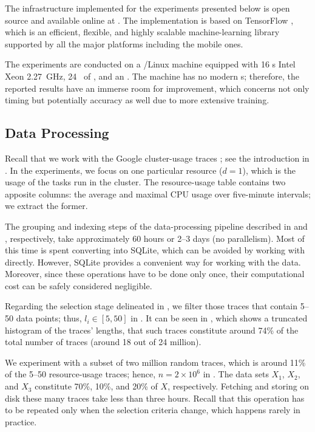 The infrastructure implemented for the experiments presented below is open
source and available online at \cite{sources}. The implementation is based on
TensorFlow \cite{abadi2015}, which is an efficient, flexible, and highly
scalable machine-learning library supported by all the major platforms including
the mobile ones.

The experiments are conducted on a /Linux machine equipped with 16
s Intel Xeon  2.27~GHz, 24~ of , and an
. The machine has no modern s; therefore, the reported results
have an immerse room for improvement, which concerns not only timing but
potentially accuracy as well due to more extensive training.

\subsection{Data Processing}
Recall that we work with the Google cluster-usage traces \cite{reiss2011}; see
the introduction in . In the experiments, we focus on one particular
resource ($d = 1$), which is the  usage of the tasks run in the cluster.
The resource-usage table contains two apposite columns: the average and maximal
CPU usage over five-minute intervals; we extract the former.

The grouping and indexing steps of the data-processing pipeline described in
 and , respectively, take approximately 60 hours
or 2--3 days (no parallelism). Most of this time is spent converting 
into SQLite, which can be avoided by working with  directly. However,
SQLite provides a convenient way for working with the data. Moreover, since
these operations have to be done only once, their computational cost can be
safely considered negligible.


Regarding the selection stage delineated in , we filter those
traces that contain 5--50 data points; thus, $l_i \in [5, 50]$ in .
It can be seen in , which shows a truncated histogram of the
traces' lengths, that such traces constitute around 74\% of the total number of
traces (around 18 out of 24 million).

We experiment with a subset of two million random traces, which is around 11\%
of the 5--50 resource-usage traces; hence, $n = 2 \times 10^6$ in .
The data sets $X_1$, $X_2$, and $X_3$ constitute 70\%, 10\%, and 20\% of $X$,
respectively. Fetching and storing on disk these many traces take less than
three hours. Recall that this operation has to be repeated only when the
selection criteria change, which happens rarely in practice.

